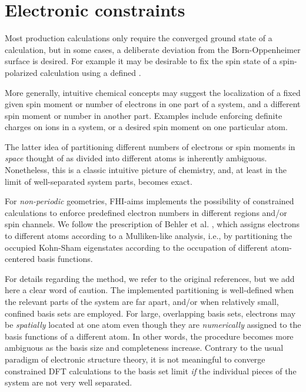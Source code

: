 \section{Electronic constraints}
\label{Sec:constraint}

Most production calculations only require the converged ground state
of a calculation, but in some cases, a deliberate deviation from the
Born-Oppenheimer surface is desired. For example it may be desirable
to fix the spin state of a spin-polarized calculation using a defined
. 

More generally, intuitive chemical concepts
may suggest the localization of a fixed given spin moment or number of
electrons in one part of a system, and a different spin moment or
number in another part. Examples include enforcing definite charges on 
ions in a system, or a desired spin moment on one particular atom.

The latter idea of partitioning different numbers of electrons or spin
moments in \emph{space} thought of as divided into different atoms is
inherently ambiguous. Nonetheless, this is a classic intuitive picture
of chemistry, and, at least in the limit of well-separated system
parts, becomes exact.

For \emph{non-periodic} geometries, FHI-aims implements the possibility
of constrained calculations to enforce predefined electron numbers in
different regions and/or spin channels. We follow the prescription of
Behler et al. \cite{Behler05,Behler07}, which assigns electrons to different
atoms according to a Mulliken-like analysis, i.e., by partitioning the
occupied Kohn-Sham eigenstates according to the occupation of
different atom-centered basis functions. 

For details regarding the method, we refer to the original references,
but we add here a clear word of caution. The implemented partitioning
is well-defined when the relevant parts of the system are far apart,
and/or when relatively small, confined basis sets are employed. For
large, overlapping basis sets, electrons may be \emph{spatially}
located at one atom even though they are \emph{numerically} assigned
to the basis functions of a different atom. In other words, the
procedure becomes more ambiguous as the basis size and completeness
increase. Contrary to the usual paradigm of electronic structure
theory, it is not meaningful to converge constrained DFT calculations
to the basis set limit \emph{if} the individual pieces of the system
are not very well separated.


